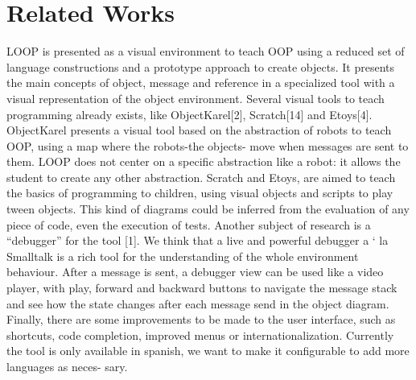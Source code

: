 \section{Related Works}
\label{sec:related}



LOOP is presented as a visual environment to teach OOP using
a reduced set of language constructions and a prototype approach
to create objects. It presents the main concepts of object, message
and reference in a specialized tool with a visual representation of
the object environment. Several visual tools to teach programming
already exists, like ObjectKarel[2], Scratch[14] and Etoys[4].
ObjectKarel presents a visual tool based on the abstraction of
robots to teach OOP, using a map where the robots-the objects-
move when messages are sent to them. LOOP does not center on a
specific abstraction like a robot: it allows the student to create any
other abstraction. Scratch and Etoys, are aimed to teach the basics
of programming to children, using visual objects and scripts to play
tween objects. This kind of diagrams could be inferred from the
evaluation of any piece of code, even the execution of tests.
Another subject of research is a “debugger” for the tool [1]. We
think that a live and powerful debugger a ` la Smalltalk is a rich tool
for the understanding of the whole environment behaviour. After a
message is sent, a debugger view can be used like a video player,
with play, forward and backward buttons to navigate the message
stack and see how the state changes after each message send in the
object diagram.
Finally, there are some improvements to be made to the user
interface, such as shortcuts, code completion, improved menus or
internationalization. Currently the tool is only available in spanish,
we want to make it configurable to add more languages as neces-
sary.

